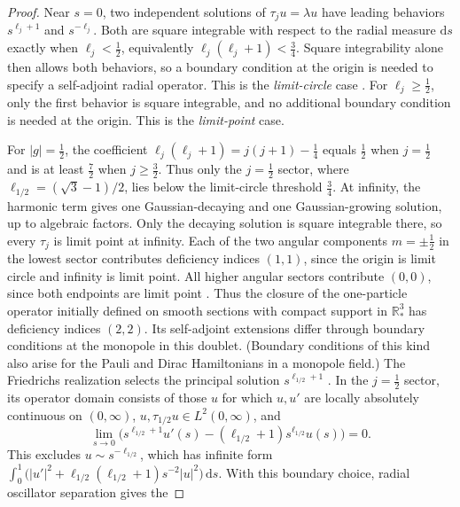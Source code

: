\documentclass[11pt,a4paper]{article}
\theoremstyle{remark}
\theoremstyle{plain}
\newcommand{\R}{\mathbb R}
\begin{document}
\begin{proof}
Near $s=0$, two independent solutions of $\tau_j u=\lambda u$
have leading behaviors $s^{\ell_j+1}$ and $s^{-\ell_j}$.
Both are square integrable with respect to the radial measure
$\mathrm{d}s$ exactly when $\ell_j<\tfrac12$, equivalently
$\ell_j(\ell_j+1)<\tfrac34$.
Square integrability alone then allows both behaviors, so a
boundary condition at the origin is needed to specify a
self-adjoint radial operator. This is the \emph{limit-circle}
case \cite[pp.~159--161]{RS2}.
For $\ell_j\ge\tfrac12$, only the first behavior is square
integrable, and no additional boundary condition is needed
at the origin. This is the \emph{limit-point} case.

For $|g|=\tfrac12$, the coefficient
$\ell_j(\ell_j+1)=j(j+1)-\tfrac14$ equals $\tfrac12$ when
$j=\tfrac12$ and is at least $\tfrac72$ when $j\ge\tfrac32$.
Thus only the $j=\tfrac12$ sector, where
$\ell_{1/2}=(\sqrt3-1)/2$, lies below the limit-circle threshold
$\tfrac34$. At infinity, the harmonic term gives one Gaussian-decaying
and one Gaussian-growing solution, up to algebraic factors.
Only the decaying solution is square integrable there, so every
$\tau_j$ is limit point at infinity.
Each of the two angular components $m=\pm\tfrac12$ in the lowest
sector contributes deficiency indices $(1,1)$, since the origin is
limit circle and infinity is limit point. All higher angular sectors
contribute $(0,0)$, since both endpoints are limit point
\cite[Sec.~9.2]{Teschl2009}. Thus the closure of the one-particle
operator initially defined on smooth sections with compact support
in $\R^3_*$ has deficiency indices $(2,2)$. Its self-adjoint extensions
differ through boundary conditions at the monopole in this doublet.
(Boundary conditions of this kind also arise for the Pauli
\cite{KarSch1997} and Dirac \cite{KYG1977} Hamiltonians in a monopole
field.) The Friedrichs
realization selects the principal solution $s^{\ell_{1/2}+1}$
\cite{Kalf1978,NZ1992}. In the $j=\tfrac12$ sector, its operator
domain consists of those $u$ for which $u,u'$ are locally absolutely
continuous on $(0,\infty)$, $u,\tau_{1/2}u\in L^2(0,\infty)$, and
\begin{equation}
 \lim_{s\to0}\bigl(s^{\ell_{1/2}+1}u'(s)
   -(\ell_{1/2}+1)s^{\ell_{1/2}}u(s)\bigr)=0.
 \label{eq:friedrichs-bc}
\end{equation}
This excludes $u\sim s^{-\ell_{1/2}}$, which has infinite form
$\int_0^1\bigl(|u'|^2+\ell_{1/2}(\ell_{1/2}+1)s^{-2}|u|^2\bigr)\,\mathrm{d}s$.
With this boundary choice, radial oscillator separation gives the

\end{proof}
\end{document}
